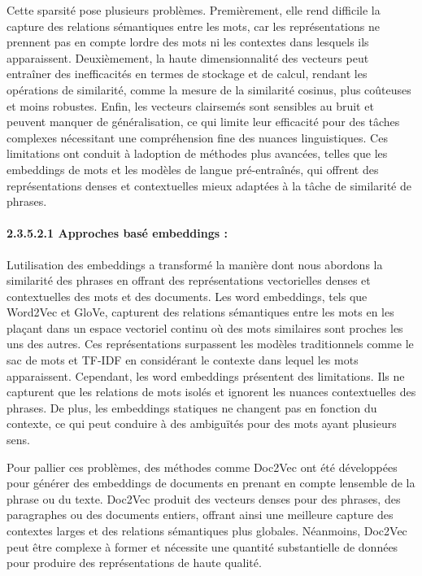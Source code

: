 \documentclass[
]{article}
\begin{document}
Cette sparsité pose plusieurs problèmes. Premièrement, elle rend
difficile la capture des relations sémantiques entre les mots, car les
représentations ne prennent pas en compte l\textquotesingle ordre des
mots ni les contextes dans lesquels ils apparaissent. Deuxièmement, la
haute dimensionnalité des vecteurs peut entraîner des inefficacités en
termes de stockage et de calcul, rendant les opérations de similarité,
comme la mesure de la similarité cosinus, plus coûteuses et moins
robustes. Enfin, les vecteurs clairsemés sont sensibles au bruit et
peuvent manquer de généralisation, ce qui limite leur efficacité pour
des tâches complexes nécessitant une compréhension fine des nuances
linguistiques. Ces limitations ont conduit à l\textquotesingle adoption
de méthodes plus avancées, telles que les embeddings de mots et les
modèles de langue pré-entraînés, qui offrent des représentations denses
et contextuelles mieux adaptées à la tâche de similarité de phrases.

\paragraph{2.3.5.2.1 Approches basé embeddings
:}\label{approches-basuxe9-embeddings}

L\textquotesingle utilisation des embeddings a transformé la manière
dont nous abordons la similarité des phrases en offrant des
représentations vectorielles denses et contextuelles des mots et des
documents. Les word embeddings, tels que Word2Vec et GloVe, capturent
des relations sémantiques entre les mots en les plaçant dans un espace
vectoriel continu où des mots similaires sont proches les uns des
autres. Ces représentations surpassent les modèles traditionnels comme
le sac de mots et TF-IDF en considérant le contexte dans lequel les mots
apparaissent. Cependant, les word embeddings présentent des limitations.
Ils ne capturent que les relations de mots isolés et ignorent les
nuances contextuelles des phrases. De plus, les embeddings statiques ne
changent pas en fonction du contexte, ce qui peut conduire à des
ambiguïtés pour des mots ayant plusieurs sens.

Pour pallier ces problèmes, des méthodes comme Doc2Vec ont été
développées pour générer des embeddings de documents en prenant en
compte l\textquotesingle ensemble de la phrase ou du texte. Doc2Vec
produit des vecteurs denses pour des phrases, des paragraphes ou des
documents entiers, offrant ainsi une meilleure capture des contextes
larges et des relations sémantiques plus globales. Néanmoins, Doc2Vec
peut être complexe à former et nécessite une quantité substantielle de
données pour produire des représentations de haute qualité.
\end{document}
